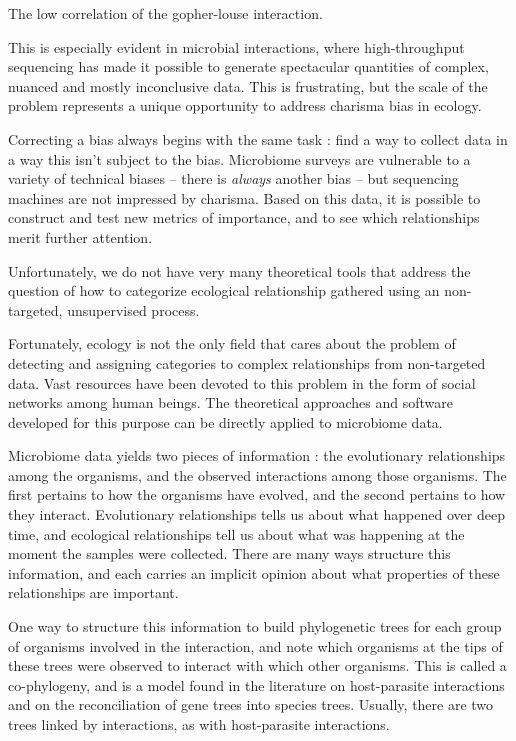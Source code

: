 
The low correlation of the gopher-louse interaction.


This is especially evident in microbial interactions, where high-throughput sequencing has made it possible to generate spectacular quantities of complex, nuanced and mostly inconclusive data. This is frustrating, but the scale of the problem represents a unique opportunity to address charisma bias in ecology.

Correcting a bias always begins with the same task : find a way to collect data in a way this isn't subject to the bias. Microbiome surveys are vulnerable to a variety of technical biases -- there is {\em always} another bias -- but sequencing machines are not impressed by charisma. Based on this data, it is possible to construct and test new metrics of importance, and to see which relationships merit further attention.

Unfortunately, we do not have very many theoretical tools that address the question of how to categorize ecological relationship gathered using an non-targeted, unsupervised process.

Fortunately, ecology is not the only field that cares about the problem of detecting and assigning categories to complex relationships from non-targeted data. Vast resources have been devoted to this problem in the form of social networks among human beings. The theoretical approaches and software developed for this purpose can be directly applied to microbiome data.

Microbiome data yields two pieces of information : the evolutionary relationships among the organisms, and the observed interactions among those organisms. The first pertains to how the organisms have evolved, and the second pertains to how they interact. Evolutionary relationships tells us about what happened over deep time, and ecological relationships tell us about what was happening at the moment the samples were collected. There are many ways structure this information, and each carries an implicit opinion about what properties of these relationships are important.

One way to structure this information to build phylogenetic trees for each group of organisms involved in the interaction, and note which organisms at the tips of these trees were observed to interact with which other organisms. This is called a co-phylogeny, and is a model found in the literature on host-parasite interactions and on the reconciliation of gene trees into species trees. Usually, there are two trees linked by interactions, as with host-parasite interactions.

